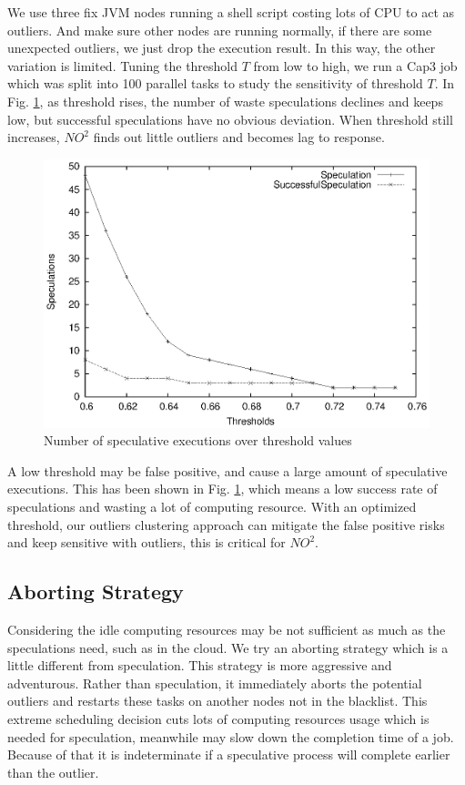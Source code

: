 We use three fix JVM nodes running a shell script costing lots of CPU to act as outliers.
And make sure other nodes are running normally, if there are some unexpected outliers, we
just drop the execution result. In this way, the other variation is limited. Tuning the
threshold $T$ from low to high, we run a Cap3 job which was split into 100 parallel tasks
to study the sensitivity of threshold $T$. In Fig. \ref{figure:thresholdtuning}, as
threshold rises, the number of waste speculations declines and keeps low, but successful
speculations have no obvious deviation. When threshold still increases, $NO^2$ finds out
little outliers and becomes lag to response.

\begin{figure}
\centering
\includegraphics[width=0.9\columnwidth]{figures/threshold&speculation.eps}
\caption{Number of speculative executions over threshold values}
\label{figure:thresholdtuning}
\end{figure}

A low threshold may be false positive, and cause a large amount of speculative executions.
This has been shown in Fig.  \ref{figure:thresholdtuning}, which means a low success rate
of speculations and wasting a lot of computing resource. With an optimized threshold, our
outliers clustering approach can mitigate the false positive risks and keep sensitive with
outliers, this is critical for $NO^2$.

\subsection{Aborting Strategy}

Considering the idle computing resources may be not sufficient as much as the speculations
need, such as in the cloud. We try an aborting strategy which is a little different from
speculation. This strategy is more aggressive and adventurous. Rather than speculation, it
immediately aborts the potential outliers and restarts these tasks on another nodes not in
the blacklist. This extreme scheduling decision cuts lots of computing resources usage
which is needed for speculation, meanwhile may slow down the completion time of a job.
Because of that it is indeterminate if a speculative process will complete earlier than
the outlier.

